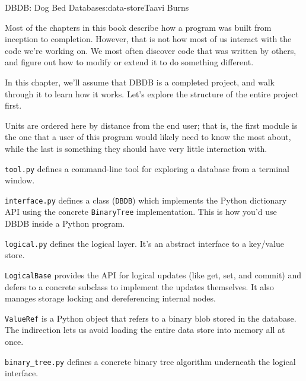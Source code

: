 \begin{aosachapter}{DBDB: Dog Bed Database}{s:data-store}{Taavi Burns}
\label{discovering-the-design}

Most of the chapters in this book describe how a program was built from
inception to completion. However, that is not how most of us interact
with the code we're working on. We most often discover code that was
written by others, and figure out how to modify or extend it to do
something different.

In this chapter, we'll assume that DBDB is a completed project, and walk
through it to learn how it works. Let's explore the structure of the
entire project first.

\label{organisational-units}

Units are ordered here by distance from the end user; that is, the first
module is the one that a user of this program would likely need to know
the most about, while the last is something they should have very little
interaction with.

\begin{aosaitemize}
\item
  \texttt{tool.py} defines a command-line tool for exploring a database
  from a terminal window.
\item
  \texttt{interface.py} defines a class (\texttt{DBDB}) which implements
  the Python dictionary API using the concrete \texttt{BinaryTree}
  implementation. This is how you'd use DBDB inside a Python program.
\item
  \texttt{logical.py} defines the logical layer. It's an abstract
  interface to a key/value store.

  \begin{aosaitemize}
  \item
    \texttt{LogicalBase} provides the API for logical updates (like get,
    set, and commit) and defers to a concrete subclass to implement the
    updates themselves. It also manages storage locking and
    dereferencing internal nodes.
  \item
    \texttt{ValueRef} is a Python object that refers to a binary blob
    stored in the database. The indirection lets us avoid loading the
    entire data store into memory all at once.
  \end{aosaitemize}
\item
  \texttt{binary\_tree.py} defines a concrete binary tree algorithm
  underneath the logical interface.


\end{aosaitemize}
\end{aosachapter}
